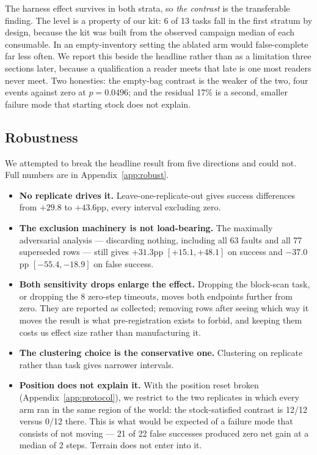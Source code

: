 \documentclass[11pt]{article}
\begin{document}
The harness effect survives in both strata, so \emph{the contrast} is
the transferable finding. The level is a property of our kit: 6 of 13
tasks fall in the first stratum by design, because the kit was built
from the observed campaign median of each consumable. In an
empty-inventory setting the ablated arm would false-complete far less
often. We report this beside the headline rather than as a limitation
three sections later, because a qualification a reader meets that late
is one most readers never meet. Two honesties: the empty-bag contrast is
the weaker of the two, four events against zero at $p = 0.0496$; and the
residual 17\% is a second, smaller failure mode that starting stock does
not explain.

\subsection{Robustness}
\label{sec:robust}

We attempted to break the headline result from five directions and could
not. Full numbers are in Appendix~\ref{app:robust}.

\begin{itemize}[leftmargin=1.3em,itemsep=.3em]
\item \textbf{No replicate drives it.} Leave-one-replicate-out gives
  success differences from $+29.8$ to $+43.6$pp, every interval
  excluding zero.
\item \textbf{The exclusion machinery is not load-bearing.} The
  maximally adversarial analysis --- discarding nothing, including all
  63 faults and all 77 superseded rows --- still gives
  $+31.3$pp $[+15.1, +48.1]$ on success and $-37.0$pp
  $[-55.4, -18.9]$ on false success.
\item \textbf{Both sensitivity drops enlarge the effect.} Dropping the
  block-scan task, or dropping the 8 zero-step timeouts, moves both
  endpoints further from zero. They are reported as collected; removing
  rows after seeing which way it moves the result is what
  pre-registration exists to forbid, and keeping them costs us effect
  size rather than manufacturing it.
\item \textbf{The clustering choice is the conservative one.}
  Clustering on replicate rather than task gives narrower intervals.
\item \textbf{Position does not explain it.} With the position reset
  broken (Appendix~\ref{app:protocol}), we restrict to the two
  replicates in which every arm ran in the same region of the world:
  the stock-satisfied contrast is 12/12 versus 0/12 there. This is what
  would be expected of a failure mode that consists of not moving ---
  21 of 22 false successes produced zero net gain at a median of 2
  steps. Terrain does not enter into it.
\end{itemize}
\end{document}
